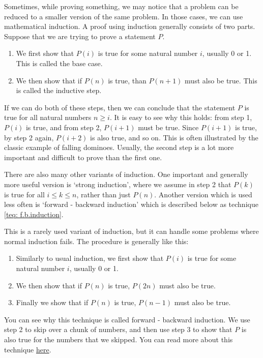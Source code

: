 \begin{technique}
    \label{teq: induction}
    Sometimes, while proving something, we may notice that a problem can be reduced to a smaller version of the same problem. In those cases, we can use mathematical induction. A proof using induction generally consists of two parts. Suppose that we are trying to prove a statement $P$.
    \begin{enumerate}
        \item We first show that $P(i)$ is true for some natural number $i$, usually 0 or 1. This is called the base case. 
        \item We then show that if $P(n)$ is true, than $P(n + 1)$ must also be true. This is called the inductive step.
    \end{enumerate}
    If we can do both of these steps, then we can conclude that the statement $P$ is true for all natural numbers $n \geq i$. It is easy to see why this holds: from step 1, $P(i)$ is true, and from step 2, $P(i + 1)$ must be true. Since $P(i + 1)$ is true, by step 2 again, $P(i + 2)$ is also true, and so on. This is often illustrated by the classic example of falling dominoes. Usually, the second step is a lot more important and difficult to prove than the first one. 

    There are also many other variants of induction. One important and generally more useful version is `strong induction', where we assume in step 2 that $P(k)$ is true for all $i \leq k \leq n$, rather than just $P(n)$. Another version which is used less often is `forward - backward induction' which is described below as technique \ref{teq: f.b.induction}.
\end{technique}

\begin{technique}
    \label{teq: f.b.induction}
    This is a rarely used variant of induction, but it can handle some problems where normal induction fails. The procedure is generally like this:
    \begin{enumerate}
        \item Similarly to usual induction, we first show that $P(i)$ is true for some natural number $i$, usually 0 or 1.

        \item We then show that if $P(n)$ is true, $P(2n)$ must also be true.

        \item Finally we show that if $P(n)$ is true, $P(n - 1)$ must also be true.
    \end{enumerate}
    You can see why this technique is called forward - backward induction. We use step 2 to skip over a chunk of numbers, and then use step 3 to show that $P$ is also true for the numbers that we skipped. You can read more about this technique \href{https://brilliant.org/wiki/forward-backwards-induction/}{here}. 
\end{technique}
